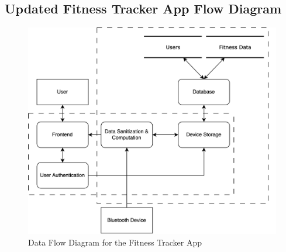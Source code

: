 \subsection{Updated Fitness Tracker App Flow Diagram}
\begin{figure}[H]
  \caption{Data Flow Diagram for the Fitness Tracker App}
  \vspace*{1em}
  \begin{center}
    \includegraphics[width=\textwidth]{Diagrams/threat-modelling-2.png}
  \end{center}
\end{figure}

